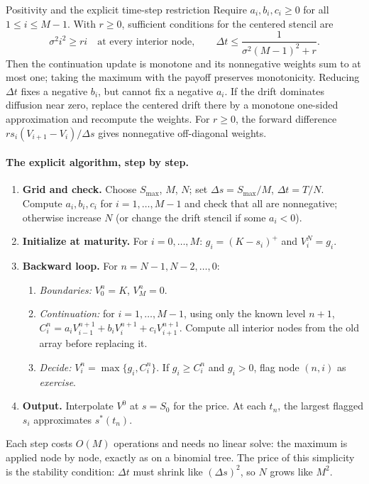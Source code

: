 \documentclass[10pt]{article}
\newcommand{\1}{\mathbf 1}
\theoremstyle{definition}
\begin{document}
\begin{warningbox}{Positivity and the explicit time-step restriction}
Require \(a_i,b_i,c_i\geq0\) for all \(1\leq i\leq M-1\). With
\(r\geq0\), sufficient conditions for the centered stencil are
\[
\sigma^2i^2\geq ri\quad\text{at every interior node},\qquad
\Delta t\leq\frac{1}{\sigma^2(M-1)^2+r}.
\]
Then the continuation update is monotone and its nonnegative weights sum
to at most one; taking the maximum with the payoff preserves monotonicity.
Reducing \(\Delta t\) fixes a negative \(b_i\), but cannot fix a negative
\(a_i\). If the drift dominates diffusion near zero, replace the centered
drift there by a monotone one-sided approximation and recompute the weights.
For \(r\geq0\), the forward difference
\(rs_i(V_{i+1}-V_i)/\Delta s\) gives nonnegative off-diagonal weights.
\end{warningbox}

\paragraph{The explicit algorithm, step by step.}
\begin{enumerate}
\item \textbf{Grid and check.} Choose \(S_{\max}\), \(M\), \(N\); set
      \(\Delta s=S_{\max}/M\), \(\Delta t=T/N\). Compute \(a_i,b_i,c_i\) for
      \(i=1,\ldots,M-1\) and check that all are nonnegative; otherwise
      increase \(N\) (or change the drift stencil if some \(a_i<0\)).
\item \textbf{Initialize at maturity.} For \(i=0,\ldots,M\):
      \(g_i=(K-s_i)^+\) and \(V_i^N=g_i\).
\item \textbf{Backward loop.} For \(n=N-1,N-2,\ldots,0\):
  \begin{enumerate}
  \item[(a)] \emph{Boundaries:} \(V_0^n=K\), \(V_M^n=0\).
  \item[(b)] \emph{Continuation:} for \(i=1,\ldots,M-1\), using only the
        known level \(n+1\),
        \(C_i^n=a_iV_{i-1}^{n+1}+b_iV_i^{n+1}+c_iV_{i+1}^{n+1}\).
        Compute all interior nodes from the old array before replacing it.
  \item[(c)] \emph{Decide:} \(V_i^n=\max\{g_i,C_i^n\}\). If
        \(g_i\geq C_i^n\) and \(g_i>0\), flag node \((n,i)\) as
        \emph{exercise}.
  \end{enumerate}
\item \textbf{Output.} Interpolate \(V^0\) at \(s=S_0\) for the price. At
      each \(t_n\), the largest flagged \(s_i\) approximates \(s^*(t_n)\).
\end{enumerate}
Each step costs \(O(M)\) operations and needs no linear solve: the maximum is
applied node by node, exactly as on a binomial tree. The price of this
simplicity is the stability condition: \(\Delta t\) must shrink like
\((\Delta s)^2\), so \(N\) grows like \(M^2\).
\end{document}
